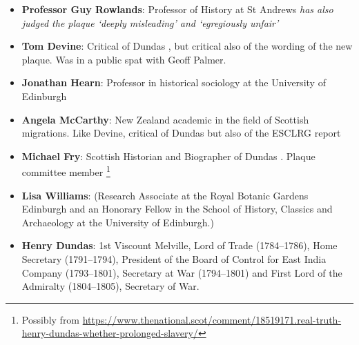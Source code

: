 \documentclass{scrartcl}
\begin{document}
\begin{itemize}
    \item \textbf{Professor Guy Rowlands}:  Professor of History at St Andrews \textit{has also judged the plaque ‘deeply misleading’ and ‘egregiously unfair’}  \cite{mccarthy_2022, rowlands_2021}
    \item \textbf{Tom Devine}: Critical of Dundas \cite{devine_2015}, but critical also of the wording of the new plaque. Was in a public spat with Geoff Palmer.
    \item \textbf{Jonathan Hearn}: Professor in historical sociology at the University of Edinburgh
    \item \textbf{Angela McCarthy}: New Zealand academic in the field of Scottish migrations. Like Devine, critical of Dundas but also of the ESCLRG report \cite{esclr_2022}
\item \textbf{Michael Fry}: Scottish Historian and Biographer of Dundas \cite{fry_1992}. Plaque committee member \cite{c4n_2018} \cite{mccarthy_2022_1}\footnote{Possibly from \url{https://www.thenational.scot/comment/18519171.real-truth-henry-dundas-whether-prolonged-slavery/}}
\item \textbf{Lisa Williams}: (Research Associate at the Royal Botanic Gardens Edinburgh and an Honorary Fellow in the School of History, Classics and Archaeology at the University of Edinburgh.)
\item \textbf{Henry Dundas}: 1st Viscount Melville,  Lord of Trade (1784–1786), Home Secretary (1791–1794), President of the Board of Control for East India Company (1793–1801), Secretary at War (1794–1801) and First Lord of the Admiralty (1804–1805), Secretary of War.

\end{itemize}
\end{document}
